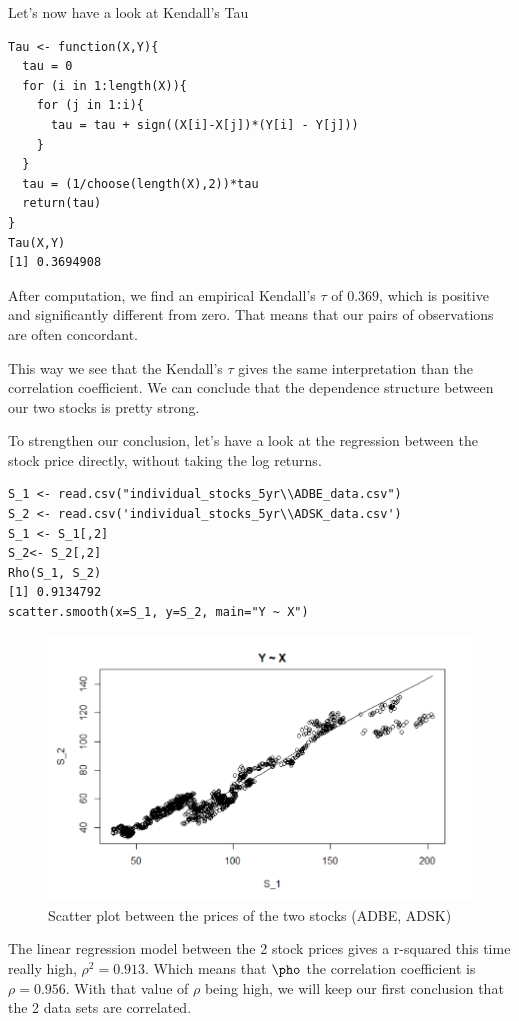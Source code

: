 \documentclass[11pt]{article}
\begin{document}
Let's now have a look  at Kendall's Tau
\begin{lstlisting}
Tau <- function(X,Y){
  tau = 0
  for (i in 1:length(X)){
    for (j in 1:i){
      tau = tau + sign((X[i]-X[j])*(Y[i] - Y[j]))
    }
  }
  tau = (1/choose(length(X),2))*tau
  return(tau)
}
Tau(X,Y)
[1] 0.3694908
\end{lstlisting}
After computation, we find an empirical Kendall's $\tau$ of $0.369$, which is positive and significantly different from zero. That means that our pairs of observations are often concordant. 

This way we see that the Kendall's $\tau$ gives the same interpretation than the correlation coefficient. We can conclude that the dependence structure between our two stocks is pretty strong.


To strengthen our conclusion, let's have a look at the regression between the stock price directly, without taking the log returns.
\begin{lstlisting}
S_1 <- read.csv("individual_stocks_5yr\\ADBE_data.csv")
S_2 <- read.csv('individual_stocks_5yr\\ADSK_data.csv')
S_1 <- S_1[,2]
S_2<- S_2[,2]
Rho(S_1, S_2)
[1] 0.9134792
scatter.smooth(x=S_1, y=S_2, main="Y ~ X")
\end{lstlisting}
\begin{figure}[!ht]
 \center
  \includegraphics[width=\linewidth]{img/scatter_plot2.PNG}
  \caption{Scatter plot between the  prices of the two stocks (ADBE, ADSK)}
  \label{fig:plot data}
\end{figure}
\pagebreak
The linear regression model between the 2 stock prices gives a r-squared this time really high, $\rho ^{2} = 0.913$. Which means that $\pho$ the correlation coefficient is $\rho = 0.956$. 
With that value of $\rho$ being high, we will keep our first conclusion that the 2 data sets are correlated.
\end{document}
